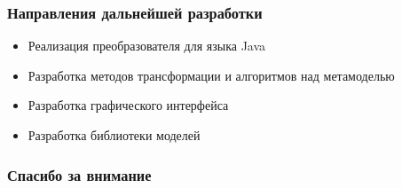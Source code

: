 \documentclass{beamer}
\begin{document}
\begin{frame}
\frametitle{Направления дальнейшей разработки}

\begin{itemize}
    \item Реализация преобразователя для языка Java
    \item Разработка методов трансформации и алгоритмов над метамоделью
    \item Разработка графического интерфейса
    \item Разработка библиотеки моделей
\end{itemize}

\end{frame}
\begin{frame}
\frametitle{Спасибо за внимание}
\end{frame}
\end{document}
